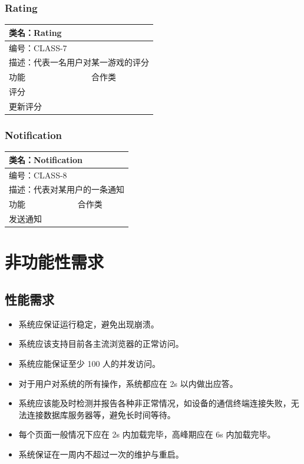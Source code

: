 \documentclass[12pt]{ctexart} %
\begin{document}
\subsubsection{Rating}
\begin{tabular}{|l|l|}
  \hline
  \multicolumn{2}{|l|}{类名：Rating} \\
  \hline
  \multicolumn{2}{|l|}{编号：CLASS-7} \\
  \hline
  \multicolumn{2}{|l|}{描述：代表一名用户对某一游戏的评分} \\
  \hline
  功能 & 合作类 \\
  \hline
  评分 & \\
  \hline
  更新评分 & \\
  \hline
  \end{tabular}

\subsubsection{Notification}
\begin{tabular}{|l|l|}
  \hline
  \multicolumn{2}{|l|}{类名：Notification} \\
  \hline
  \multicolumn{2}{|l|}{编号：CLASS-8} \\
  \hline
  \multicolumn{2}{|l|}{描述：代表对某用户的一条通知} \\
  \hline
  功能 & 合作类 \\
  \hline
  发送通知 & \\
  \hline
  \end{tabular}

\section{非功能性需求}
\subsection{性能需求}

\begin{itemize}
    \item 系统应保证运行稳定，避免出现崩溃。
    \item 系统应该支持目前各主流浏览器的正常访问。
    \item 系统应能保证至少 100 人的并发访问。
    \item 对于用户对系统的所有操作，系统都应在 2s 以内做出应答。
    \item 系统应该能及时检测并报告各种非正常情况，如设备的通信终端连接失败，无法连接数据库服务器等，避免长时间等待。
    \item 每个页面一般情况下应在 2s 内加载完毕，高峰期应在 6s 内加载完毕。
    \item 系统保证在一周内不超过一次的维护与重启。
\end{itemize}
\end{document}
